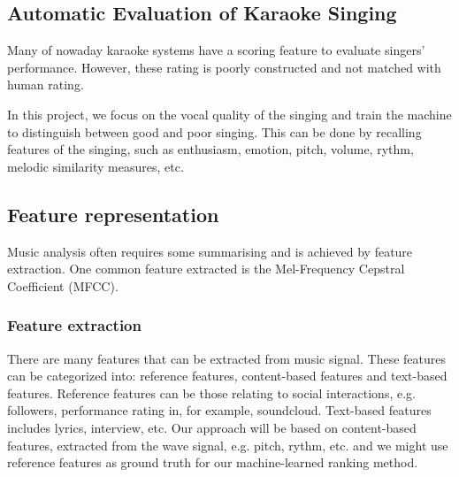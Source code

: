 \documentclass[paper=a4, fontsize=11pt, DIV=13]{scrartcl}
\begin{document}
\subsection{Automatic Evaluation of Karaoke Singing}
Many of nowaday karaoke systems have a scoring feature to evaluate singers' performance. However, these rating is poorly constructed and not matched with human rating. 

In this project, we focus on the vocal quality of the singing and train the machine to distinguish between good and poor singing. This can be done by recalling features of the singing, such as enthusiasm, emotion, pitch, volume, rythm, melodic similarity measures, etc.

\subsection{Feature representation}
Music analysis often requires some summarising and is achieved by feature extraction. One common feature extracted is the Mel-Frequency Cepstral Coefficient (MFCC).

\subsubsection{Feature extraction}


There are many features that can be extracted from music signal. These features can be categorized into: reference features, content-based features and text-based features. Reference features can be those relating to social interactions, e.g. followers, performance rating in, for example, soundcloud. Text-based features includes lyrics, interview, etc. Our approach will be based on content-based features, extracted from the wave signal, e.g. pitch, rythm, etc. and we might use reference features as ground truth for our machine-learned ranking method.
\end{document}
